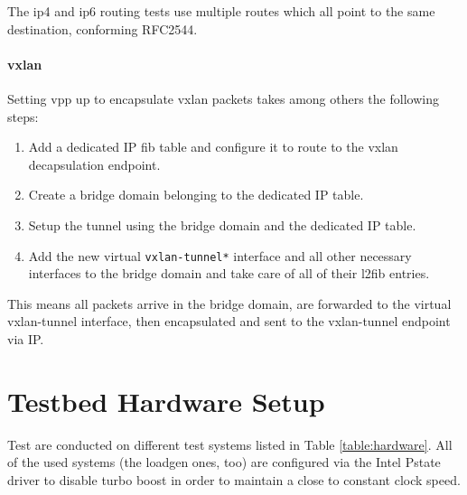 The \Ac{ip4} and \Ac{ip6} routing tests use multiple routes which all
point to the same destination, conforming RFC2544.

\paragraph{\Ac{vxlan}}

Setting \Ac{vpp} up to encapsulate \Ac{vxlan} packets takes among
others the following steps:

\begin{enumerate}
	\item Add a dedicated IP \Ac{fib} table and configure it to route to the \Ac{vxlan} decapsulation endpoint.
	\item Create a bridge domain belonging to the dedicated IP table.
	\item Setup the tunnel using the bridge domain and the dedicated IP table.
	\item Add the new virtual \lstinline|vxlan-tunnel*| interface and all other necessary interfaces to the bridge domain and take care of all of their l2fib entries. 
\end{enumerate}

This means all packets arrive in the bridge domain, are forwarded to
the virtual vxlan-tunnel interface, then encapsulated and sent to the
vxlan-tunnel endpoint via IP.


\section{Testbed Hardware Setup}
\label{sec:hardware}

Test are conducted on different test systems listed in Table
\ref{table:hardware}. All of the used systems (the \Ac{loadgen} ones,
too) are configured via the Intel Pstate driver to disable turbo boost
in order to maintain a close to constant clock speed.


